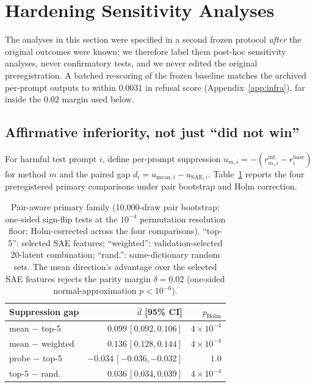 \documentclass[11pt]{article}
\begin{document}
\section{Hardening Sensitivity Analyses}
\label{sec:hardening}

The analyses in this section were specified in a second frozen protocol
\emph{after} the original outcomes were known; we therefore label them
post-hoc sensitivity analyses, never confirmatory tests, and we never edited
the original preregistration.  A batched re-scoring of the frozen baseline
matches the archived per-prompt outputs to within $0.0031$ in refusal score
(Appendix~\ref{app:infra}), far inside the $0.02$ margin used below.

\subsection{Affirmative inferiority, not just ``did not win''}
\label{sec:inferiority}

For harmful test prompt $i$, define per-prompt suppression
$u_{m,i}=-(r^{\mathrm{int}}_{m,i}-r^{\mathrm{base}}_{i})$ for method $m$ and
the paired gap $d_i=u_{\mathrm{mean},i}-u_{\mathrm{SAE},i}$.
Table~\ref{tab:holm} reports the four preregistered primary comparisons under
pair bootstrap and Holm correction.

\begin{table}[t]
\centering
\footnotesize
\setlength{\tabcolsep}{3pt}
\begin{tabular}{@{}lrr@{}}
\toprule
Suppression gap & $\bar d$ [95\% CI] & $p_{\mathrm{Holm}}$ \\
\midrule
mean $-$ top-5 & $0.099\,[0.092,0.106]$ & $4{\times}10^{-4}$ \\
mean $-$ weighted & $0.136\,[0.128,0.144]$ & $4{\times}10^{-4}$ \\
probe $-$ top-5 & $-0.034\,[-0.036,-0.032]$ & $1.0$ \\
top-5 $-$ rand. & $0.036\,[0.034,0.039]$ & $4{\times}10^{-4}$ \\
\bottomrule
\end{tabular}
\caption{Pair-aware primary family (10{,}000-draw pair bootstrap; one-sided
sign-flip tests at the $10^{-4}$ permutation resolution floor; Holm-corrected
across the four comparisons).  ``top-5'': selected SAE features;
``weighted'': validation-selected 20-latent combination; ``rand.'':
same-dictionary random sets.  The mean direction's advantage over the
selected SAE features rejects the parity margin $\delta=0.02$ (one-sided
normal-approximation $p<10^{-6}$).}
\label{tab:holm}
\end{table}
\end{document}
